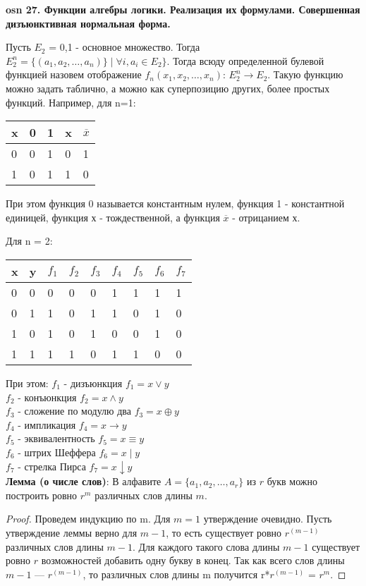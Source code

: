 \textbf{\LARGE osn 27. Функции алгебры логики. Реализация их формулами. Совершенная дизъюнктивная нормальная форма.}

Пусть $E_{2}$ = {0,1} - основное множество. Тогда $E^n_{2} = \{(a_{1}, a_{2}, \ldots, a_{n}) \} \mid \forall i, a_{i} \in E_{2}\}$. Тогда всюду определенной булевой функцией назовем отображение $f_{n}(x_{1}, x_{2}, \ldots, x_{n})$: $E^n_{2} \rightarrow E_{2}$. Такую функцию можно задать таблично, а можно как суперпозицию других, более простых функций. Например, для n=1: \\

\begin{tabular}{ l | l l l l}
x & 0 & 1 & x & $\overline{x}$ \\
\hline
0 & 0 & 1 & 0 & 1\\
1 & 0 & 1 & 1 & 0\\
\end{tabular}


При этом функция 0 называется константным нулем, функция 1 - константной единицей, функция х - тождественной, а функция $\overline{x}$ - отрицанием х.  

Для n = 2: \\
\begin{tabular}{ l l | l l l l l l l}
x & y & $f_{1}$ & $f_{2}$ & $f_{3}$ & $f_{4}$ & $f_{5}$ & $f_{6}$ & $f_{7}$ \\
\hline
0 & 0 & 0 & 0 & 0 & 1 & 1 & 1 & 1 \\
0 & 1 & 1 & 0 & 1 & 1 & 0 & 1 & 0 \\
1 & 0 & 1 & 0 & 1 & 0 & 0 & 1 & 0 \\
1 & 1 & 1 & 1 & 0 & 1 & 1 & 0 & 0 \\
\end{tabular}

При этом: 
$f_{1}$ - дизъюнкция $f_{1} = x \vee y$\\
$f_{2}$ - конъюнкция $f_{2} = x \wedge y$ \\
$f_{3}$ - сложение по модулю два $f_{3} = x \oplus y$ \\
$f_{4}$ - импликация $f_{4} = x \rightarrow y$ \\
$f_{5}$ - эквивалентность $f_{5} = x \equiv y$\\
$f_{6}$ - штрих Шеффера $f_{6} = x \mid y$ \\
$f_{7}$ - стрелка Пирса $f_{7} = x \downarrow y$ \\

\textbf{Лемма (о числе слов)}: В алфавите $A = \{a_{1}, a_{2}, \ldots, a_{r}\}$ из $r$ букв можно построить ровно $r^m$ различных слов длины $m$. \\
\begin{proof}
Проведем индукцию по m. Для $m = 1$ утверждение очевидно. Пусть утверждение леммы верно для $m - 1$, то есть существует ровно $r^{(m-1)}$ различных слов длины $m - 1$. Для каждого такого слова длины $m-1$ существует ровно $r$ возможностей добавить одну букву в конец. Так как всего слов длины $m-1$ --- $r^{(m-1)}$, то различных слов длины m получится r*$r^{(m-1)}$ = $r^m$. 
\end{proof}

